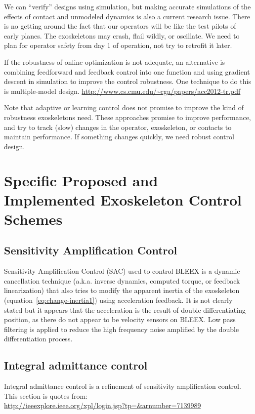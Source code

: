 \documentclass[letterpaper,12pt,fullpage]{article}
\begin{document}
We can ``verify'' designs using simulation, but making accurate simulations of
the effects of contact and unmodeled dynamics is also a current research issue.
There is no getting around the fact that our operators will be like the test
pilots of early planes. The exoskeletons may crash, flail wildly, or oscillate.
We need to plan for operator safety from day 1 of operation, not try to retrofit
it later.

If the robustness of online optimization is not adequate, an alternative is
combining feedforward and feedback control into one function and using gradient
descent in simulation to improve the control robustness.
One technique to do this is multiple-model design.
\url{http://www.cs.cmu.edu/~cga/papers/acc2012-tr.pdf}

Note that adaptive or learning
control does not promise to improve the kind of robustness exoskeletons need. 
These approaches promise
to improve performance, and try to track (slow) changes in the operator, exoskeleton,
or contacts to maintain performance. If something changes quickly, we need robust
control design.

\section{Specific Proposed and Implemented Exoskeleton Control Schemes}

\subsection{Sensitivity Amplification Control}

Sensitivity Amplification Control (SAC) used to control BLEEX
is a dynamic cancellation technique (a.k.a.
inverse dynamics, computed torque, or feedback linearization) that also tries
to modify the apparent inertia of the exoskeleton (equation~\ref{eq:change-inertia1})
using acceleration feedback. It is not clearly stated but it appears that the
acceleration is the result of double differentiating position, as there do not
appear to be velocity sensors on BLEEX. Low pass filtering is applied to reduce
the high frequency noise amplified by the double differentiation process.

\subsection{Integral admittance control}

Integral admittance control is a refinement of 
sensitivity amplification control.
This section is quotes from:\\
\url{http://ieeexplore.ieee.org/xpl/login.jsp?tp=&arnumber=7139989}
\end{document}
